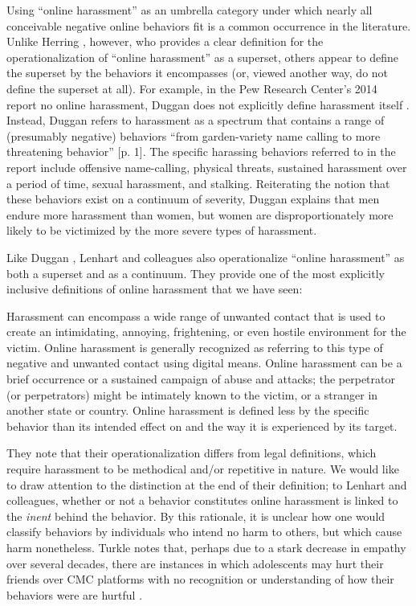 \documentclass{sigchi}
\begin{document}
Using ``online harassment'' as an umbrella category under which nearly all conceivable negative online behaviors fit is a common occurrence in the literature.  Unlike Herring \cite{Herring1999Rhetorical}, however, who provides a clear definition for the operationalization of ``online harassment'' as a superset, others appear to define the superset by the behaviors it encompasses (or, viewed another way, do not define the superset at all).  For example, in the Pew Research Center's 2014 report no online harassment, Duggan does not explicitly define harassment itself \cite{Duggan2014Online}.  Instead, Duggan refers to harassment as a spectrum that contains a range of (presumably negative) behaviors ``from garden-variety name calling to more threatening behavior'' [p. 1].  The specific harassing behaviors referred to in the report include offensive name-calling, physical threats, sustained harassment over a period of time, sexual harassment, and stalking.  Reiterating the notion that these behaviors exist on a continuum of severity, Duggan explains that men endure more harassment than women, but women are disproportionately more likely to be victimized by the more severe types of harassment.

Like Duggan \cite{Duggan2014Online}, Lenhart and colleagues \cite{Lenhart2016Online} also operationalize ``online harassment'' as both a superset and as a continuum.  They provide one of the most explicitly inclusive definitions of online harassment that we have seen:

\begin{displayquote}
Harassment can encompass a wide range of unwanted contact that is used to create an intimidating, annoying, frightening, or even hostile environment for the victim. Online harassment is generally recognized as referring to this type of negative and unwanted contact using digital means. Online harassment can be a brief occurrence or a sustained campaign of abuse and attacks; the perpetrator (or perpetrators) might be intimately known to the victim, or a stranger in another state or country. Online harassment is defined less by the specific behavior than its intended effect on and the way it is experienced by its target.
\end{displayquote}

They note that their operationalization differs from legal definitions, which require harassment to be methodical and/or repetitive in nature.  We would like to draw attention to the distinction at the end of their definition; to Lenhart and colleagues, whether or not a behavior constitutes online harassment is linked to the \textit{inent} behind the behavior.  By this rationale, it is unclear how one would classify behaviors by individuals who intend no harm to others, but which cause harm nonetheless.  Turkle notes that, perhaps due to a stark decrease in empathy over several decades, there are instances in which adolescents may hurt their friends over CMC platforms with no recognition or understanding of how their behaviors were are hurtful \cite{Turkle2015Reclaiming}.  
\end{document}
